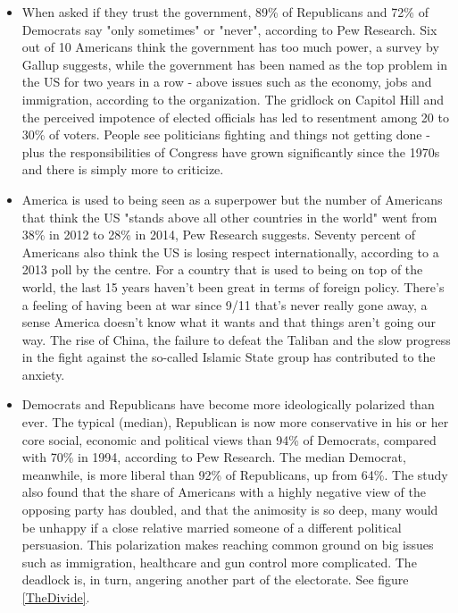 \documentclass{sig-alternate-05-2015}
\begin{document}
\begin{itemize}
\item When asked if they trust the government\cite{BBC}, 89\% of Republicans and 72\% of Democrats say "only sometimes" or "never", according to Pew Research. Six out of 10 Americans think the government has too much power, a survey by Gallup suggests, while the government has been named as the top problem in the US for two years in a row - above issues such as the economy, jobs and immigration, according to the organization. The gridlock on Capitol Hill and the perceived impotence of elected officials has led to resentment among 20 to 30\% of voters. People see politicians fighting and things not getting done - plus the responsibilities of Congress have grown significantly since the 1970s and there is simply more to criticize. 

\item America is used to being seen as a superpower but the number of Americans that think the US "stands above all other countries in the world" went from 38\% in 2012 to 28\% in 2014\cite{BBC}, Pew Research suggests. Seventy percent of Americans also think the US is losing respect internationally, according to a 2013 poll by the centre.
For a country that is used to being on top of the world, the last 15 years haven't been great in terms of foreign policy. There's a feeling of having been at war since 9/11 that's never really gone away, a sense America doesn't know what it wants and that things aren't going our way. The rise of China, the failure to defeat the Taliban and the slow progress in the fight against the so-called Islamic State group has contributed to the anxiety.

\item Democrats and Republicans have become more ideologically polarized than ever\cite{BBC}. The typical (median), Republican is now more conservative in his or her core social, economic and political views than 94\% of Democrats, compared with 70\% in 1994, according to Pew Research. The median Democrat, meanwhile, is more liberal than 92\% of Republicans, up from 64\%. The study also found that the share of Americans with a highly negative view of the opposing party has doubled, and that the animosity is so deep, many would be unhappy if a close relative married someone of a different political persuasion. This polarization makes reaching common ground on big issues such as immigration, healthcare and gun control more complicated. The deadlock is, in turn, angering another part of the electorate. See figure \ref{TheDivide}.
\end{itemize}
\end{document}
